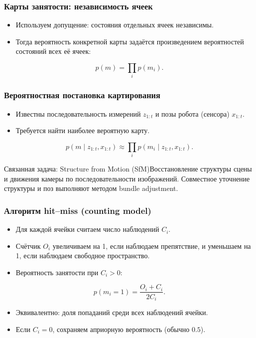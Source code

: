 \documentclass[aspectratio=169,xcolor=dvipsnames]{beamer}
\begin{document}
\begin{frame}
\frametitle{Карты занятости: независимость ячеек}
\small \begin{itemize}
\item Используем допущение: состояния отдельных ячеек независимы.
\item Тогда вероятность конкретной карты задаётся произведением вероятностей состояний всех её ячеек:
\end{itemize}
\[p(m)=\prod_i p(m_i).\]\begin{center}\end{center}
\end{frame}

\begin{frame}
\frametitle{Вероятностная постановка картирования}
\small \begin{itemize}
\item Известны последовательность измерений $z_{1:t}$ и позы робота (сенсора) $x_{1:t}$.
\item Требуется найти наиболее вероятную карту.
\end{itemize}
\[p(m\mid z_{1:t},x_{1:t})\approx\prod_i p(m_i\mid z_{1:t},x_{1:t}).\]\begin{block}{Связанная задача: Structure from Motion (SfM)}Восстановление структуры сцены и движения камеры по последовательности изображений. Совместное уточнение структуры и поз выполняют методом bundle adjustment.\end{block}
\end{frame}

\begin{frame}
\frametitle{Алгоритм hit--miss (counting model)}
\small \begin{itemize}
\item Для каждой ячейки считаем число наблюдений $C_i$.
\item Счётчик $O_i$ увеличиваем на 1, если наблюдаем препятствие, и уменьшаем на 1, если наблюдаем свободное пространство.
\item Вероятность занятости при $C_i>0$:
\end{itemize}
\[p(m_i=1)=\frac{O_i+C_i}{2C_i}.\]\begin{itemize}
\item Эквивалентно: доля попаданий среди всех наблюдений ячейки.
\item Если $C_i=0$, сохраняем априорную вероятность (обычно $0.5$).
\end{itemize}
\end{frame}
\end{document}

